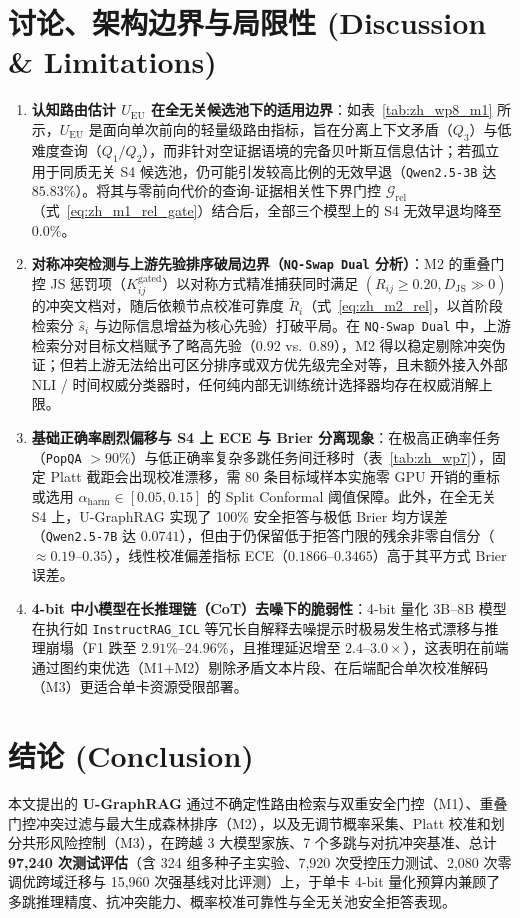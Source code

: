 \documentclass[11pt]{article}
\begin{document}
\section{讨论、架构边界与局限性 (Discussion \& Limitations)}

\begin{enumerate}[leftmargin=*,nosep]
    \item \textbf{认知路由估计 $U_{\text{EU}}$ 在全无关候选池下的适用边界}：如表~\ref{tab:zh_wp8_m1} 所示，$U_{\text{EU}}$ 是面向单次前向的轻量级路由指标，旨在分离上下文矛盾（$Q_3$）与低难度查询（$Q_1/Q_2$），而非针对空证据语境的完备贝叶斯互信息估计；若孤立用于同质无关 S4 候选池，仍可能引发较高比例的无效早退（\texttt{Qwen2.5-3B} 达 $85.83\%$）。将其与零前向代价的查询-证据相关性下界门控 $\mathcal{G}_{\text{rel}}$（式~\eqref{eq:zh_m1_rel_gate}）结合后，全部三个模型上的 S4 无效早退均降至 $0.0\%$。
    \item \textbf{对称冲突检测与上游先验排序破局边界（\texttt{NQ-Swap Dual} 分析）}：M2 的重叠门控 JS 惩罚项（$K_{ij}^{\text{gated}}$）以对称方式精准捕获同时满足 $(R_{ij} \ge 0.20, D_{\text{JS}} \gg 0)$ 的冲突文档对，随后依赖节点校准可靠度 $\tilde{R}_i$（式~\eqref{eq:zh_m2_rel}，以首阶段检索分 $\hat{s}_i$ 与边际信息增益为核心先验）打破平局。在 \texttt{NQ-Swap Dual} 中，上游检索分对目标文档赋予了略高先验（$0.92$ vs.\ $0.89$），M2 得以稳定剔除冲突伪证；但若上游无法给出可区分排序或双方优先级完全对等，且未额外接入外部 NLI / 时间权威分类器时，任何纯内部无训练统计选择器均存在权威消解上限。
    \item \textbf{基础正确率剧烈偏移与 S4 上 ECE 与 Brier 分离现象}：在极高正确率任务（\texttt{PopQA} $>90\%$）与低正确率复杂多跳任务间迁移时（表~\ref{tab:zh_wp7}），固定 Platt 截距会出现校准漂移，需 $80$ 条目标域样本实施零 GPU 开销的重标或选用 $\alpha_{\text{harm}} \in [0.05, 0.15]$ 的 Split Conformal 阈值保障。此外，在全无关 S4 上，U-GraphRAG 实现了 100\% 安全拒答与极低 Brier 均方误差（\texttt{Qwen2.5-7B} 达 $0.0741$），但由于仍保留低于拒答门限的残余非零自信分（$\approx 0.19\text{--}0.35$），线性校准偏差指标 ECE（$0.1866\text{--}0.3465$）高于其平方式 Brier 误差。
    \item \textbf{4-bit 中小模型在长推理链（CoT）去噪下的脆弱性}：4-bit 量化 3B--8B 模型在执行如 \texttt{InstructRAG\_ICL} 等冗长自解释去噪提示时极易发生格式漂移与推理崩塌（F1 跌至 $2.91\%\text{--}24.96\%$，且推理延迟增至 $2.4\text{--}3.0\times$），这表明在前端通过图约束优选（M1+M2）剔除矛盾文本片段、在后端配合单次校准解码（M3）更适合单卡资源受限部署。
\end{enumerate}

\section{结论 (Conclusion)}

本文提出的 \textbf{U-GraphRAG} 通过不确定性路由检索与双重安全门控（M1）、重叠门控冲突过滤与最大生成森林排序（M2），以及无调节概率采集、Platt 校准和划分共形风险控制（M3），在跨越 3 大模型家族、7 个多跳与对抗冲突基准、总计 \textbf{97,240 次测试评估}（含 324 组多种子主实验、7,920 次受控压力测试、2,080 次零调优跨域迁移与 15,960 次强基线对比评测）上，于单卡 4-bit 量化预算内兼顾了多跳推理精度、抗冲突能力、概率校准可靠性与全无关池安全拒答表现。


\end{document}
